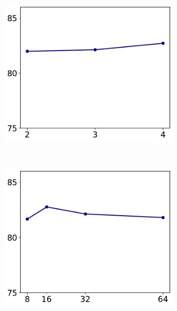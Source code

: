 \documentclass[10pt]{article} %
\begin{document}
\begin{figure}[ht]
    \begin{center}
    \begin{subfigure}[b]{0.22 \linewidth}
        \begin{center}
        \includegraphics[width=\linewidth]{./img/nlayer}
        \caption{}
        \label{fig:nlayer} 
        \end{center}
    \end{subfigure}
    \,
    \begin{subfigure}[b]{0.22 \linewidth}
        \begin{center}
        \includegraphics[width=\linewidth]{./img/nchannel}

\end{center}
\end{subfigure}
\end{center}
\end{figure}
\end{document}
